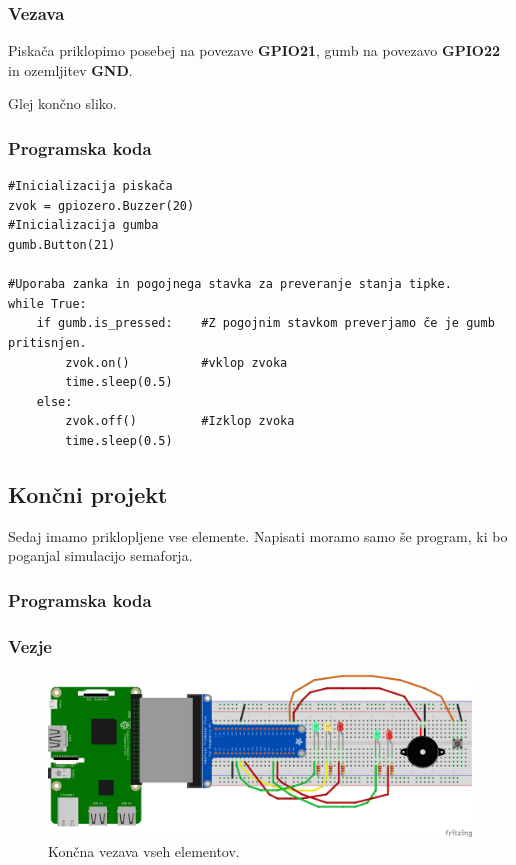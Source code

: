 \documentclass[11pt]{article}
\begin{document}
\subsubsection{Vezava}
\label{sec:org8c90177}
Piskača priklopimo posebej na povezave \textbf{GPIO21}, gumb na povezavo \textbf{GPIO22}
in ozemljitev \textbf{GND}. 

Glej končno sliko.

\subsubsection{Programska koda}
\label{sec:org69120d0}
\begin{verbatim}
#Inicializacija piskača
zvok = gpiozero.Buzzer(20)
#Inicializacija gumba
gumb.Button(21)

#Uporaba zanka in pogojnega stavka za preveranje stanja tipke.
while True:
    if gumb.is_pressed:    #Z pogojnim stavkom preverjamo če je gumb pritisnjen. 
        zvok.on()          #vklop zvoka
        time.sleep(0.5)
    else:
        zvok.off()         #Izklop zvoka
        time.sleep(0.5)
\end{verbatim}

\subsection{Končni projekt}
\label{sec:org42f7cc0}
Sedaj imamo priklopljene vse elemente. Napisati moramo samo še program, ki 
bo poganjal simulacijo semaforja. 

\subsubsection{Programska koda}
\label{sec:org5b9a69a}


\subsubsection{Vezje}
\label{sec:orgb9d6900}
\begin{figure}[htbp]
\centering
\includegraphics[width=.9\linewidth]{breadboard/REB_RES_3LEDsem_2LED_sem_BT_BUZ_bb.png}
\caption{\label{fig:orgaddee64}
Končna vezava vseh elementov.}
\end{figure}
\end{document}
